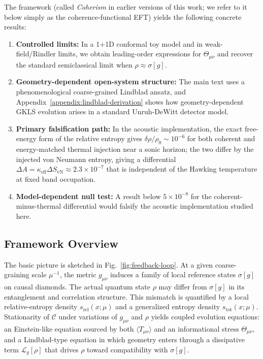 \documentclass[aps,prd,twocolumn,superscriptaddress,nofootinbib,floatfix]{revtex4-2}
\newcommand{\Cfunc}{\mathcal{C}}
\newcommand{\Tmn}{\Theta_{\mu\nu}}
\begin{document}
The framework (called \emph{Coherism} in earlier versions of this work; we refer to it below simply as the coherence-functional EFT) yields the following concrete results:
\begin{enumerate}
    \item \textbf{Controlled limits:} In a 1+1D conformal toy model and in weak-field/Rindler limits, we obtain leading-order expressions for $\Tmn$ and recover the standard semiclassical limit when $\rho \approx \sigma[g]$.
    \item \textbf{Geometry-dependent open-system structure:} The main text uses a phenomenological coarse-grained Lindblad ansatz, and Appendix~\ref{appendix:lindblad-derivation} shows how geometry-dependent GKLS evolution arises in a standard Unruh-DeWitt detector model.
    \item \textbf{Primary falsification path:} In the acoustic implementation, the exact free-energy form of the relative entropy gives $\delta\rho/\rho_0 \sim 10^{-6}$ for both coherent and energy-matched thermal injection near a sonic horizon; the two differ by the injected von Neumann entropy, giving a differential $\Delta A = \kappa_{\mathrm{eff}}\Delta S_{\mathrm{vN}} \approx 2.3\times10^{-7}$ that is independent of the Hawking temperature at fixed band occupation.
    \item \textbf{Model-dependent null test:} A result below $5\times10^{-8}$ for the coherent-minus-thermal differential would falsify the acoustic implementation studied here.
\end{enumerate}

\subsection{Framework Overview}

The basic picture is sketched in Fig.~\ref{fig:feedback-loop}.
At a given coarse-graining scale $\mu^{-1}$, the metric $g_{\mu\nu}$ induces a family of local reference states $\sigma[g]$ on causal diamonds.
The actual quantum state $\rho$ may differ from $\sigma[g]$ in its entanglement and correlation structure.
This mismatch is quantified by a local relative-entropy density $s_{\mathrm{rel}}(x;\mu)$ and a generalized entropy density $s_{\mathrm{tot}}(x;\mu)$.
Stationarity of $\Cfunc$ under variations of $g_{\mu\nu}$ and $\rho$ yields coupled evolution equations:
an Einstein-like equation sourced by both $\langle T_{\mu\nu}\rangle$ and an informational stress $\Tmn$, and a Lindblad-type equation in which geometry enters through a dissipative term $\mathcal{L}_g[\rho]$ that drives $\rho$ toward compatibility with $\sigma[g]$.
\end{document}
